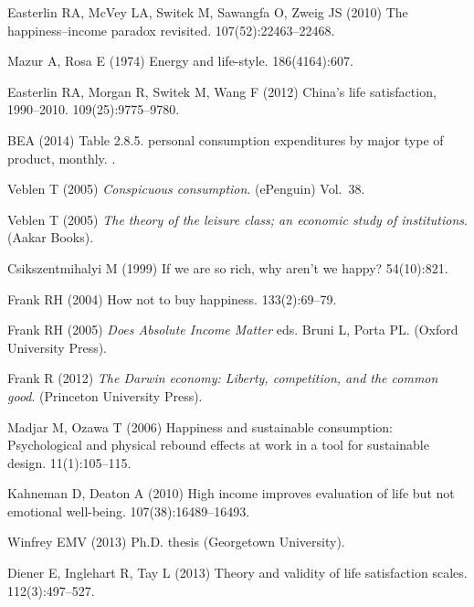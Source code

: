\documentclass[10pt, letterpaper]{article}
\begin{document}
\begin{spacing}{1.4}
\begin{thebibliography}{10}
Easterlin RA, McVey LA, Switek M, Sawangfa O, Zweig JS (2010) The
  happiness--income paradox revisited.
  107(52):22463--22468.

Mazur A, Rosa E (1974) Energy and life-style.
 186(4164):607.

Easterlin RA, Morgan R, Switek M, Wang F (2012) China's life satisfaction,
  1990--2010.
  109(25):9775--9780.

BEA (2014) Table 2.8.5. personal consumption expenditures by major type of
  product, monthly.
.

Veblen T (2005) {\em Conspicuous consumption}.
\newblock (ePenguin) Vol.{}~38.

Veblen T (2005) {\em The theory of the leisure class; an economic study of
  institutions}.
\newblock (Aakar Books).

Csikszentmihalyi M (1999) If we are so rich, why aren't we happy?
 54(10):821.

Frank RH (2004) How not to buy happiness.
 133(2):69--79.

Frank RH (2005) {\em Does Absolute Income Matter} eds.{} Bruni L, Porta PL.
\newblock (Oxford University Press).

Frank R (2012) {\em The Darwin economy: Liberty, competition, and the common
  good}.
\newblock (Princeton University Press).

Madjar M, Ozawa T (2006) Happiness and sustainable consumption: Psychological
  and physical rebound effects at work in a tool for sustainable design.
  11(1):105--115.

Kahneman D, Deaton A (2010) High income improves evaluation of life but not
  emotional well-being.
  107(38):16489--16493.

Winfrey EMV (2013) Ph.D. thesis (Georgetown University).

Diener E, Inglehart R, Tay L (2013) Theory and validity of life satisfaction
  scales.
 112(3):497--527.


\end{thebibliography}
\end{spacing}
\end{document}
